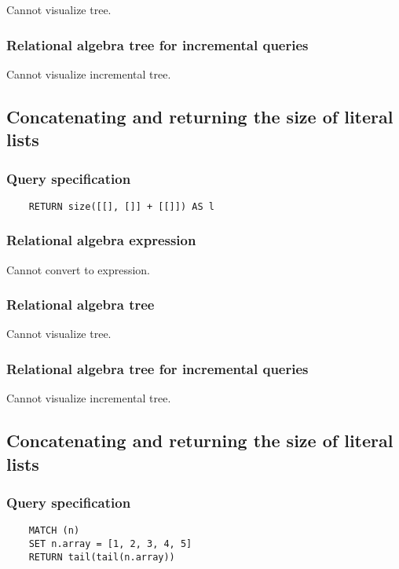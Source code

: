 	Cannot visualize tree.

	\subsubsection*{Relational algebra tree for incremental queries}

	Cannot visualize incremental tree.
	\subsection{Concatenating and returning the size of literal lists}

	\subsubsection*{Query specification}

	\begin{lstlisting}
	RETURN size([[], []] + [[]]) AS l
	\end{lstlisting}


	\subsubsection*{Relational algebra expression}

	Cannot convert to expression.

	\subsubsection*{Relational algebra tree}

	Cannot visualize tree.

	\subsubsection*{Relational algebra tree for incremental queries}

	Cannot visualize incremental tree.
	\subsection{Concatenating and returning the size of literal lists}

	\subsubsection*{Query specification}

	\begin{lstlisting}
	MATCH (n)
	SET n.array = [1, 2, 3, 4, 5]
	RETURN tail(tail(n.array))
	\end{lstlisting}


